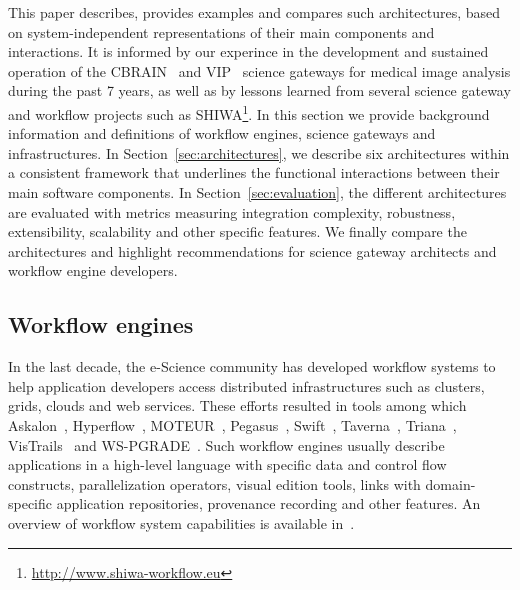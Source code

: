 \documentclass[preprint,3p,twocolumn]{elsarticle}
\begin{document}
This paper describes, provides examples and compares such
architectures, based on system-independent representations of their
main components and interactions. It is informed by our experince in
the development and sustained operation of the CBRAIN~\cite{SHER-14}
and VIP~\cite{GLAT-13} science gateways for medical image analysis
during the past 7 years, as well as by lessons learned from several
science gateway and workflow projects such as
SHIWA\footnote{\url{http://www.shiwa-workflow.eu}}.  In this section
we provide background information and definitions of 
workflow engines, science gateways and infrastructures. In
Section~\ref{sec:architectures}, we describe six architectures within
a consistent framework that underlines the functional interactions
between their main software components. In
Section~\ref{sec:evaluation}, the different architectures are
evaluated with metrics measuring integration complexity, robustness,
extensibility, scalability and other specific features. We finally
compare the architectures and highlight recommendations for science
gateway architects and workflow engine developers.

\subsection{Workflow engines}

In the last decade, the e-Science community has developed workflow
systems to help application developers access distributed
infrastructures such as clusters, grids, clouds and web
services. These efforts resulted in tools among which
Askalon~\cite{fahringer2005askalon},
Hyperflow~\cite{balis2016hyperflow}, MOTEUR~\cite{GLAT-08i},
Pegasus~\cite{deelman2005pegasus,Deelman201517},
Swift~\cite{zhao2007swift}, Taverna~\cite{oinn2004taverna},
Triana~\cite{taylor2007triana}, VisTrails~\cite{callahan2006managing}
and WS-PGRADE~\cite{Kacsuk2012}. Such workflow engines usually
describe applications in a high-level language with specific data and
control flow constructs, parallelization operators, visual edition
tools, links with domain-specific application repositories, provenance
recording and other features. An overview of workflow system
capabilities is available in~\cite{deelman2009workflows}.
\end{document}
